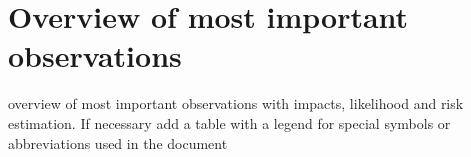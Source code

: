 \chapter{Overview of most important observations}
overview of most important observations with impacts, likelihood and risk
estimation. If necessary add a table with a legend for special symbols or abbreviations used in the document